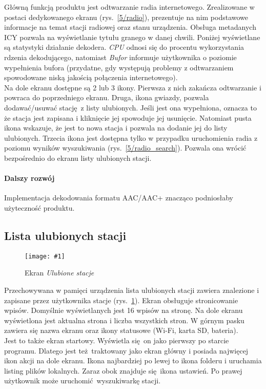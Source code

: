 \documentclass[12pt]{report}
\newcommand{\imgint}[4]{
	\begin{figure}[{#4}]
		\centering
		\texttt{[image: \#1]}
		\caption{#2}
		\label{#1}
	\end{figure}
}
\newcommand{\imgh}[3]{\imgint{#1}{#2}{#3}{H}}
\begin{document}
			Główną funkcją produktu jest odtwarzanie radia internetowego. Zrealizowane w postaci dedykowanego ekranu (rys.~\ref{5/radio}), prezentuje na nim podstawowe informacje na temat stacji radiowej oraz stanu urządzenia. Obsługa metadanych ICY pozwala na wyświetlanie tytułu granego w danej chwili. Poniżej wyświetlane są statystyki działanie dekodera. \textit{CPU} odnosi się do procentu wykorzystania rdzenia dekodującego, natomiast \textit{Bufor} informuje użytkownika o poziomie wypełnienia bufora (przydatne, gdy występują problemy z odtwarzaniem spowodowane niską jakością połączenia internetowego).
			$ $\\
			
			Na dole ekranu dostępne są 2 lub 3 ikony. Pierwsza z nich zakańcza odtwarzanie i powraca do poprzedniego ekranu. Druga, ikona gwiazdy, pozwala dodawać/usuwać stację z listy ulubionych. Jeśli jest ona wypełniona, oznacza to że stacja jest zapisana i kliknięcie jej spowoduje jej usunięcie. Natomiast pusta ikona wskazuje, że jest to nowa stacja i pozwala na dodanie jej do listy ulubionych. Trzecia ikona jest dostępna tylko w przypadku uruchomienia radia z poziomu wyników wyszukiwania (rys.~\ref{5/radio_search}). Pozwala ona wrócić bezpośrednio do ekranu listy ulubionych stacji.
		
			\paragraph{Dalszy rozwój}
				Implementacja dekodowania formatu AAC/AAC+ znacząco podniosłaby użyteczność produktu.
			
		\subsection{Lista ulubionych stacji}
			\imgh{5/fav}{Ekran \textit{Ulubione stacje}}{0.5}
			Przechowywana w pamięci urządzenia lista ulubionych stacji zawiera znalezione i zapisane przez użytkownika stacje (rys.~\ref{5/fav}).
			Ekran obsługuje stronicowanie wpisów. Domyślnie wyświetlanych jest 16 wpisów na stronę. Na dole ekranu wyświetlona jest aktualna strona i liczba wszystkich stron.
			W górnym pasku zawiera się nazwa ekranu oraz ikony statusowe (Wi-Fi, karta SD, bateria).
			$ $\\
			
			Jest to także ekran startowy. Wyświetla się on jako pierwszy po starcie programu. Dlatego jest też traktowany jako ekran główny i posiada najwięcej ikon akcji na dole ekranu.
			Ikona najbardziej po lewej to ikona folderu i uruchamia listing plików lokalnych. Zaraz obok znajduje się ikona ustawień. Po prawej użytkownik może uruchomić wyszukiwarkę stacji.
			
\end{document}
